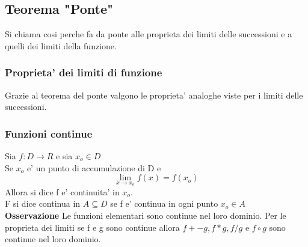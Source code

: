 \documentclass{article}
\begin{document}
        \subsection{Teorema "Ponte"}
        \begin{flushleft}
            Si chiama cosi perche fa da ponte alle proprieta dei limiti delle successioni e a quelli dei limiti della funzione.
        \end{flushleft}
        \subsubsection{Proprieta' dei limiti di funzione}
        \begin{flushleft}
            Grazie al teorema del ponte valgono le proprieta' analoghe viste per i limiti delle successioni.
        \end{flushleft}
        \subsubsection{Funzioni continue}
        \begin{flushleft}
            Sia $f: D\to R$ e sia $x_o \in D$\\
            Se $x_o$ e' un punto di accumulazione di D e
            \begin{equation}
                \lim_{x \to x_o} f(x)=f(x_o)
            \end{equation}
            Allora si dice f e' continuita' in $x_o$.\\
            F si dice continua in $A\subseteq D$ se f e' continua in ogni punto $x_o \in A$ \\
            \textbf{Osservazione} Le funzioni elementari sono continue nel loro dominio. Per le proprieta dei limiti
            se f e g sono continue allora $f+-g,f*g,f/g$ e $f \circ g$ sono continue nel loro dominio.
        \end{flushleft}
\end{document}
